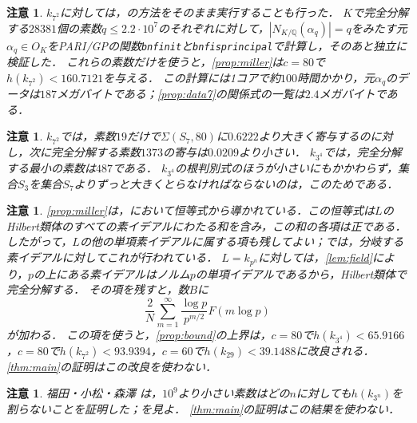 \documentclass[11pt,a4paper]{ltjsarticle}
\theoremstyle{ja}
\newtheorem{remark}[theorem]{注意}
\begin{document}
\begin{remark} \label{rem:first}
$k_{7^2}$に対しては，\cite{Mi15b}の方法をそのまま実行することも行った．
$K$で完全分解する$28381$個の素数$q \le 2.2 \cdot 10^7$のそれぞれに対して，$|N_{K/\mathbb{Q}}(\alpha_q)| = q$をみたす元$\alpha_q \in O_K$をPARI/GPの関数\texttt{bnfinit}と\texttt{bnfisprincipal}で計算し，そのあと独立に検証した．
これらの素数だけを使うと，\cref{prop:miller}は$c = 80$で$h(k_{7^2}) < 160.7121$を与える．
この計算には1コアで約$100$時間かかり，元$\alpha_q$のデータは$187$メガバイトである；\cref{prop:data7}の関係式の一覧は$2.4$メガバイトである．
\end{remark}

\begin{remark} \label{rem:19}
$k_{7^2}$では，素数$19$だけで$\Sigma(S_7, 80)$に$0.6222$より大きく寄与するのに対し，次に完全分解する素数$1373$の寄与は$0.0209$より小さい．
$k_{3^4}$では，完全分解する最小の素数は$487$である．
$k_{3^4}$の根判別式のほうが小さいにもかかわらず，集合$S_3$を集合$S_7$よりずっと大きくとらなければならないのは，このためである．
\end{remark}

\begin{remark} \label{rem:ramified}
\cref{prop:miller}は，\cite{Mi14}において恒等式\cite[(4.1)]{Mi14}から導かれている．この恒等式は$L$のHilbert類体のすべての素イデアルにわたる和を含み，この和の各項は正である．
したがって，$L$の他の単項素イデアルに属する項も残してよい；\cite[Section 6]{Mi14}では，分岐する素イデアルに対してこれが行われている．
$L = k_{p^n}$に対しては，\cref{lem:field}により，$p$の上にある素イデアルはノルム$p$の単項イデアルであるから，Hilbert類体で完全分解する．
その項を残すと，数$B$に
\[
\frac{2}{N} \sum_{m=1}^{\infty} \frac{\log p}{p^{m/2}} F(m \log p)
\]
が加わる．
この項を使うと，\cref{prop:bound}の上界は，$c = 80$で$h(k_{3^4}) < 65.9166$，$c = 80$で$h(k_{7^2}) < 93.9394$，$c = 60$で$h(k_{29}) < 39.1488$に改良される．
\cref{thm:main}の証明はこの改良を使わない．
\end{remark}

\begin{remark} \label{rem:fkm}
福田・小松・森澤 \cite{FKM14}は，$10^9$より小さい素数はどの$n$に対しても$h(k_{3^n})$を割らないことを証明した；\cite[Theorem 5]{Mi15b}を見よ．
\cref{thm:main}の証明はこの結果を使わない．
\end{remark}
\end{document}
